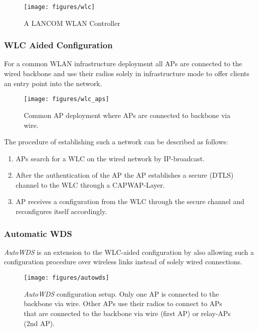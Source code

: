 	\begin{figure}[h!]
	  \centering
	  \texttt{[image: figures/wlc]}
	  \caption{A LANCOM WLAN Controller \cite{lancom}}
	  \label{fig:wlc}
	\end{figure}
	
	\newpage
      
      \subsubsection{WLC Aided Configuration}
	For a common \ac{WLAN} infrastructure deployment all APs are connected to the wired backbone and use their radios solely in infrastructure mode to 
	offer clients an entry point into the network.
	\begin{figure}[h!]
	  \centering
	  \texttt{[image: figures/wlc\_aps]}
	  \caption{Common \ac{AP} deployment where APs are connected to backbone via wire.}
	  \label{fig:wlc_aps}
	\end{figure}
	The procedure of establishing such a network can be described as follows:
	\begin{enumerate}
	 \item APs search for a \ac{WLC} on the wired network by \ac{IP}-broadcast.
	 \item After the authentication of the \ac{AP} the \ac{AP} establishes a secure (\ac{DTLS}) channel to the \ac{WLC} through a \ac{CAPWAP}-Layer.
	 \item \ac{AP} receives a configuration from the \ac{WLC} through the secure channel and reconfigures itself accordingly.
	\end{enumerate}
	
      \subsubsection{Automatic \ac{WDS}}
	\label{autowdsbasic}
	\textit{AutoWDS} is an extension to the \ac{WLC}-aided configuration by also allowing such a configuration procedure over wireless links instead of solely wired connections.
            
	\begin{figure}[h!]
	  \centering
	  \texttt{[image: figures/autowds]}
	  \caption{\textit{AutoWDS} configuration setup. Only one AP is connected to the backbone via wire. 
	    Other APs use their radios to connect to APs that are connected to the backbone via wire (first \ac{AP}) or relay-APs (2nd \ac{AP}).}
	  \label{fig:autowds}
	\end{figure}
	
